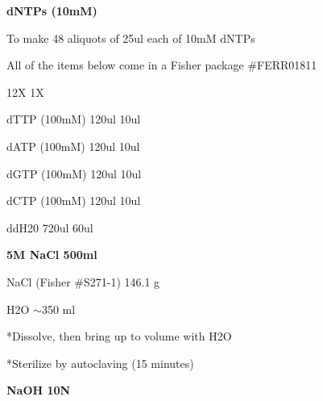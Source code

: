 \documentclass[11pt, oneside]{article}
\begin{document}
		{\bf dNTPs (10mM)}

			\hspace{2mm}To make 48 aliquots of 25ul each of 10mM dNTPs

			\hspace{2mm}All of the items below come in a Fisher package \#FERR01811

			\hspace{40mm}			12X	 \hspace{5mm}	1X
			
			\hspace{2mm}dTTP (100mM)	\hspace{9mm} 120ul	\hspace{5mm}	10ul

			\hspace{2mm}dATP (100mM)	\hspace{9mm} 120ul	\hspace{5mm}	10ul

			\hspace{2mm}dGTP (100mM)	\hspace{9mm} 120ul	\hspace{5mm}	10ul

			\hspace{2mm}dCTP (100mM)	\hspace{9mm} 120ul	\hspace{5mm}	10ul

			\hspace{2mm}ddH20 \hspace{25mm}		720ul	\hspace{5mm}	60ul
	
		\vspace{5mm}

		{\bf 5M NaCl 500ml}

			\hspace{2mm}NaCl	\hspace{5mm}  (Fisher \#S271-1) \hspace{3mm} 146.1 g

			\hspace{2mm}H2O 		\hspace{40mm}			$\sim$350 ml 

			\hspace{2mm}*Dissolve, then bring up to volume with H2O

			\hspace{2mm}*Sterilize by autoclaving (15 minutes)

		\vspace{5mm}

		{\bf NaOH 10N}
\end{document}
